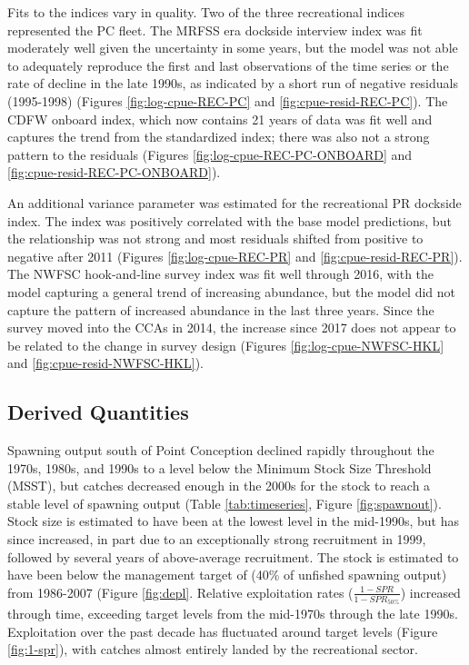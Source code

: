 \documentclass[11pt,
  english,
]{article}
\begin{document}
\tagstructend

Fits to the indices vary in quality. Two of the three recreational indices represented the PC fleet. The MRFSS era dockside interview index was fit moderately well given the uncertainty in some years, but the model was not able to adequately reproduce the first and last observations of the time series or the rate of decline in the late 1990s, as indicated by a short run of negative residuals (1995-1998) (Figures \ref{fig:log-cpue-REC-PC} and \ref{fig:cpue-resid-REC-PC}). The CDFW onboard index, which now contains 21 years of data was fit well and captures the trend from the standardized index; there was also not a strong pattern to the residuals (Figures \ref{fig:log-cpue-REC-PC-ONBOARD} and \ref{fig:cpue-resid-REC-PC-ONBOARD}).

An additional variance parameter was estimated for the recreational PR dockside index. The index was positively correlated with the base model predictions, but the relationship was not strong and most residuals shifted from positive to negative after 2011 (Figures \ref{fig:log-cpue-REC-PR} and \ref{fig:cpue-resid-REC-PR}). The NWFSC hook-and-line survey index was fit well through 2016, with the model capturing a general trend of increasing abundance, but the model did not capture the pattern of increased abundance in the last three years. Since the survey moved into the CCAs in 2014, the increase since 2017 does not appear to be related to the change in survey design (Figures \ref{fig:log-cpue-NWFSC-HKL} and \ref{fig:cpue-resid-NWFSC-HKL}).


\hypertarget{derived-quantities}{%
\subsection{Derived Quantities}\label{derived-quantities}}

\leavevmode\tagmcend\tagstructend

Spawning output south of Point Conception declined rapidly throughout the 1970s, 1980s, and 1990s to a level below the Minimum Stock Size Threshold (MSST), but catches decreased enough in the 2000s for the stock to reach a stable level of spawning output (Table \ref{tab:timeseries}, Figure \ref{fig:spawnout}). Stock size is estimated to have been at the lowest level in the mid-1990s, but has since increased, in part due to an exceptionally strong recruitment in 1999, followed by several years of above-average recruitment. The stock is estimated to have been below the management target of (40\% of unfished spawning output) from 1986-2007 (Figure \ref{fig:depl}. Relative exploitation rates ({\(\frac{1-SPR}{1-SPR_{50\%}}\)\leavevmode\tagmcend\tagstructend}) increased through time, exceeding target levels from the mid-1970s through the late 1990s. Exploitation over the past decade has fluctuated around target levels (Figure \ref{fig:1-spr}), with catches almost entirely landed by the recreational sector.
\end{document}
